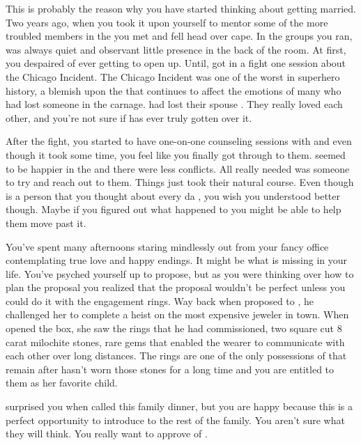 \documentclass[char]{LRSguildcamp1}
\begin{document}
This is probably the reason why you have started thinking about getting married. Two years ago, when you took it upon yourself to mentor some of the more troubled members in the \cHeroLeague{} you met \cYS{} and fell head over cape. In the groups you ran, \cYS{\they} was always quiet and observant little presence in the back of the room. At first, you despaired of ever getting \cYS{\them} to open up. Until, \cYS{\they} got in a fight one session about the Chicago Incident. The Chicago Incident was one of the worst in superhero history, a blemish upon the \cHeroLeague{} that continues to affect the emotions of many who had lost someone in the carnage. \cArchitect{} had lost their spouse \cAS{\intro}. They really loved each other, and you're not sure if \cArchitect{\they} has ever truly gotten over it. 

After the fight, you started to have one-on-one counseling sessions with \cYS{} and even though it took some time, you feel like you finally got through to them. \cYS{} seemed to be happier in the \cHeroLeague{} and there were less conflicts.  All \cYS{\they} really needed was someone to try and reach out to them. Things just took their natural course. Even though \cYS{\they} is a person that you thought about every da , you wish you understood \cYS{\them} better though. Maybe if you figured out what happened to \cYS{\them} you might be able to help them move past it.  
 
You've spent many afternoons staring mindlessly out from your fancy \cHeroLeague{} office contemplating true love and happy endings. It might be what is missing in your life. You've psyched yourself up to propose, but as you were thinking over how to plan the proposal you realized that the proposal wouldn't be perfect unless you could do it with the engagement rings. Way back when \cGS{\parent} proposed to \cGrandma{\parent}, he challenged her to complete a heist on the most expensive jeweler in town. When \cGrandma{\they} opened the box, she saw the rings that he had commissioned, two square cut 8 carat milochite stones, rare gems that enabled the wearer to communicate with each other over long distances. The rings are one of the only possessions of \cGS{\parent} that remain after \cGS{\their} \cGrandma{\they} hasn't worn those stones for a long time and you are entitled to them as her favorite child.  

 \cGrandma{\parent} surprised you when \cGrandma{\they} called this family dinner, but you are happy because this is a perfect opportunity to introduce \cYS{} to the rest of the family. You aren't sure what they will think. You really want \cGrandma{\parent} to approve of \cYS{}. 
\end{document}

